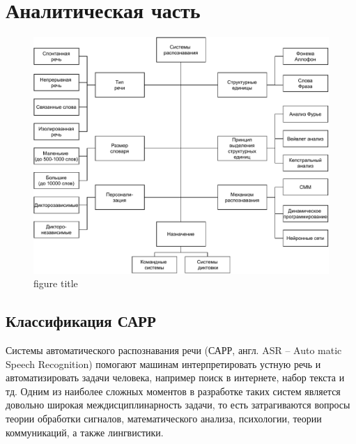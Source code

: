 \chapter{Аналитическая часть}


\begin{figure}[h]
	\centering
	\includegraphics[scale=0.2]{./inc/img/2.pdf}
	\caption{figure title}
	\label{figure}
\end{figure}


\section{Классификация САРР}
Системы автоматического распознавания речи (САРР, англ. ASR -- Auto matic Speech Recognition) помогают машинам интерпретировать устную речь и автоматизировать задачи человека, например поиск в интернете, набор текста и тд. Одним из наиболее сложных моментов в разработке таких систем является довольно широкая междисциплинарность задачи, то есть затрагиваются вопросы теории обработки сигналов, математического анализа, психологии, теории коммуникаций, а также лингвистики.

